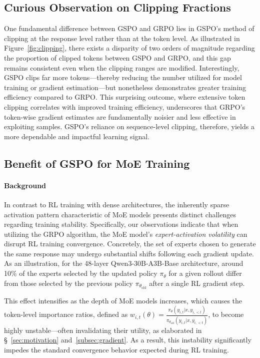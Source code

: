 \subsection{Curious Observation on Clipping Fractions}

One fundamental difference between GSPO and GRPO lies in GSPO's method of clipping at the response level rather than at the token level. As illustrated in Figure~\ref{fig:clipping}, there exists a disparity of two orders of magnitude regarding the proportion of clipped tokens between GSPO and GRPO, and this gap remains consistent even when the clipping ranges are modified. Interestingly, GSPO clips far more tokens—thereby reducing the number utilized for model training or gradient estimation—but nonetheless demonstrates greater training efficiency compared to GRPO. This surprising outcome, where extensive token clipping correlates with improved training efficiency, underscores that GRPO's token-wise gradient estimates are fundamentally noisier and less effective in exploiting samples. GSPO's reliance on sequence-level clipping, therefore, yields a more dependable and impactful learning signal.

\subsection{Benefit of GSPO for MoE Training}
\label{subsec:routing_replay}

\paragraph{Background}
In contrast to RL training with dense architectures, the inherently sparse activation pattern characteristic of MoE models presents distinct challenges regarding training stability. Specifically, our observations indicate that when utilizing the GRPO algorithm, the MoE model’s \textit{expert-activation volatility} can disrupt RL training convergence. Concretely, the set of experts chosen to generate the same response may undergo substantial shifts following each gradient update. As an illustration, for the 48-layer Qwen3-30B-A3B-Base architecture, around 10\% of the experts selected by the updated policy $\pi_{\theta}$ for a given rollout differ from those selected by the previous policy $\pi_{\theta_\text{old}}$ after a single RL gradient step.

This effect intensifies as the depth of MoE models increases, which causes the token-level importance ratios, defined as $w_{i,t}(\theta) = \frac{ \pi_{\theta} (y_{i,t} | x, y_{i,<t}) }{ \pi_{\theta_\text{old}} (y_{i,t} | x,y_{i,<t})}$, to become highly unstable—often invalidating their utility, as elaborated in \S~\ref{sec:motivation} and~\ref{subsec:gradient}. As a result, this instability significantly impedes the standard convergence behavior expected during RL training.

